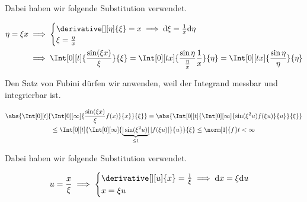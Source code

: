 \begin{solution}
\begin{enumerate}[label = \arabic*.]
    Dabei haben wir folgende Substitution verwendet.

    \begin{align*}
        \eta = \xi x
        & \implies
        \begin{cases}
            \derivative[][\eta]{\xi} = x \implies \mathrm{d} \xi = \frac{1}{x} \mathrm{d} \eta \\
            \xi = \frac{\eta}{x}
        \end{cases} \\
        & \implies
        \Int[0][t]
        {
            \frac{\sin(\xi x)}{\xi}
        }{\xi}
        =
        \Int[0][t x]
        {
            \frac{\sin \eta}{\frac{\eta}{x}}
            \frac{1}{x}
        }{\eta}
        =
        \Int[0][t x]
        {
            \frac{\sin \eta}{\eta}
        }{\eta}
    \end{align*}

    Den Satz von Fubini dürfen wir anwenden, weil der Integrand messbar und integrierbar ist.

    \begin{multline*}
        \abs
        {
            \Int[0][t]
            {
                \Int[0][\infty]
                {
                    \frac{\sin(\xi x)}{\xi}
                    f(x)
                }{x}
            }{\xi}
        }
        =
        \abs
        {
            \Int[0][t]
            {
                \Int[0][\infty]
                {
                    \sin(\xi^2 u)
                    f(\xi u)
                }{u}
            }{\xi}
        } \\
        \leq
        \Int[0][t]
        {
            \Int[0][\infty]
            {
                \underbrace
                {
                    |\sin(\xi^2 u)|
                }_{\leq 1}
                |f(\xi u)|
            }{u}
        }{\xi}
        \leq
        \norm[1]{f} t
        <
        \infty
    \end{multline*}

    Dabei haben wir folgende Substitution verwendet.

    \begin{align*}
        u = \frac{x}{\xi}
        \implies
        \begin{cases}
            \derivative[][u]{x} = \frac{1}{\xi} \implies \mathrm{d} x = \xi \mathrm{d} u \\
            x = \xi u
        \end{cases}
    \end{align*}


\end{enumerate}
\end{solution}
